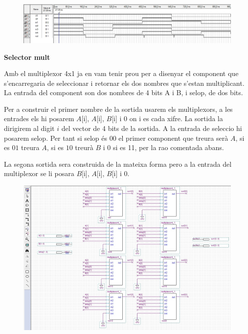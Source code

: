 \documentclass[12pt, a4papre]{article}
\begin{document}
		\begin{center}
	\begin{figure}[H]
		\begin{center}
		\includegraphics[width=150mm]{plexor4_1.jpeg}
		\end{center}
	\end{figure}
	
	\textbf{\large{Selector mult}}
	
	Amb el multiplexor 4x1 ja en vam tenir prou per a disenyar el component que s'encarregaria de seleccionar i retornar els dos nombres que s'estan multiplicant. La entrada del component son dos nombres de 4 bits A i B, i selop, de dos bits. 
	
	Per a construir el primer nombre de la sortida usarem els multiplexors, a les entrades els hi posarem $A$[i], $A$[i], $B$[i] i 0 on i es cada xifre. La sortida la dirigirem al digit $i$ del vector de 4 bits de la sortida. A la entrada de seleccio hi posarem selop. Per tant si selop és $00$ el primer component que treura serà $A$, si es $01$ treura $A$, si es $10$ treurà $B$ i 0 si es 11, per la rao comentada abans.
	
	La segona sortida sera construida de la mateixa forma pero a la entrada del multiplexor se li posara $B$[i], $A$[i], $B$[i] i 0.
	
		\begin{center}
	\begin{figure}[H]
		\begin{center}
		\includegraphics[width=150mm]{selectormult.jpeg}
		\end{center}
	\end{figure}
	\end{center}
	

\end{center}
\end{document}
